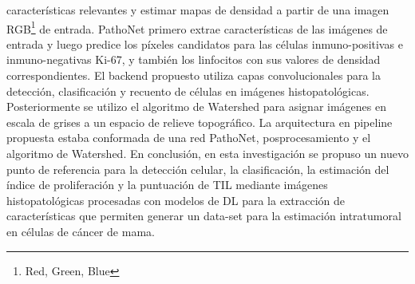 características relevantes y estimar mapas de densidad a partir de una imagen RGB\footnote{Red, Green, Blue} de entrada. PathoNet primero extrae características de las imágenes de entrada y luego predice los píxeles candidatos para las células inmuno-positivas e inmuno-negativas Ki-67, y también los linfocitos con sus valores de densidad correspondientes. El backend propuesto utiliza capas convolucionales para la detección, clasificación y recuento de células en imágenes histopatológicas. Posteriormente se utilizo el algoritmo de Watershed para asignar imágenes en escala de grises a un espacio de relieve topográfico. La arquitectura en pipeline propuesta estaba conformada de una red PathoNet, posprocesamiento y el algoritmo de Watershed. En conclusión, en esta investigación se propuso un nuevo punto de referencia para la detección celular, la clasificación, la estimación del índice de proliferación y la puntuación de TIL mediante imágenes histopatológicas procesadas con modelos de DL para la extracción de características que permiten generar un data-set para la estimación intratumoral en células de cáncer de mama.
